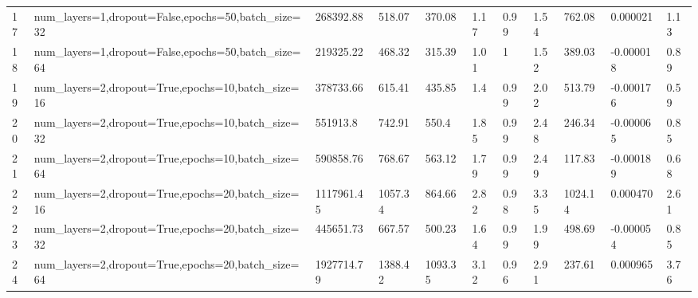 \begin{longtable}{C{0.8cm} L{2cm} C{1.15cm} C{1.15cm} C{1.15cm} C{1.15cm} C{0.85cm} C{1.25cm} C{1.2cm} C{1.5cm} C{1.0cm}}
17 & num\_layers=1,\newline dropout=False,\newline epochs=50,\newline batch\_size=32 & 268392.88 & 518.07 & 370.08 & 1.17 & 0.99 & 1.54 & 762.08 & 0.000021 & 1.13 \\
18 & num\_layers=1,\newline dropout=False,\newline epochs=50,\newline batch\_size=64 & 219325.22 & 468.32 & 315.39 & 1.01 & 1 & 1.52 & 389.03 & -0.000018 & 0.89 \\
19 & num\_layers=2,\newline dropout=True,\newline epochs=10,\newline batch\_size=16 & 378733.66 & 615.41 & 435.85 & 1.4 & 0.99 & 2.02 & 513.79 & -0.000176 & 0.59 \\
20 & num\_layers=2,\newline dropout=True,\newline epochs=10,\newline batch\_size=32 & 551913.8 & 742.91 & 550.4 & 1.85 & 0.99 & 2.48 & 246.34 & -0.000065 & 0.85 \\
21 & num\_layers=2,\newline dropout=True,\newline epochs=10,\newline batch\_size=64 & 590858.76 & 768.67 & 563.12 & 1.79 & 0.99 & 2.49 & 117.83 & -0.000189 & 0.68 \\
22 & num\_layers=2,\newline dropout=True,\newline epochs=20,\newline batch\_size=16 & 1117961.45 & 1057.34 & 864.66 & 2.82 & 0.98 & 3.35 & 1024.14 & 0.000470 & 2.61 \\
23 & num\_layers=2,\newline dropout=True,\newline epochs=20,\newline batch\_size=32 & 445651.73 & 667.57 & 500.23 & 1.64 & 0.99 & 1.99 & 498.69 & -0.000054 & 0.85 \\
24 & num\_layers=2,\newline dropout=True,\newline epochs=20,\newline batch\_size=64 & 1927714.79 & 1388.42 & 1093.35 & 3.12 & 0.96 & 2.91 & 237.61 & 0.000965 & 3.76 \\

\end{longtable}
